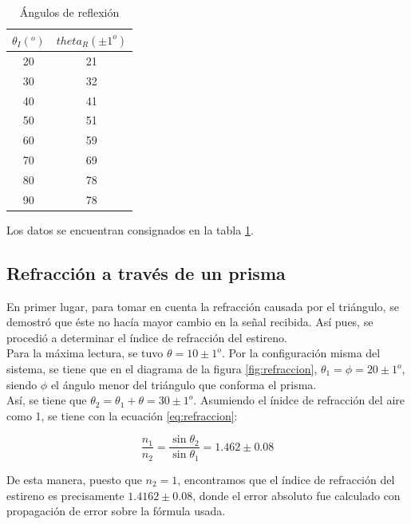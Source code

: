 \documentclass[%
 reprint,
 amsmath,amssymb,
 aps,
]{revtex4-1}
\begin{document}
\begin{table}[h!]
\centering
\begin{tabular}{|c|c|}
	\hline $ \theta_I (^o) $ & $ theta_R ( \pm 1^o  )$  \\ 
	\hline\hline
	20 &  21\\ 
	30 &  32\\ 
	40 &  41\\ 
	50 &  51\\ 
	60 &  59\\ 
	70 &  69\\ 
	80 &  78\\ 
	90 &  78\\ 
	[1ex] 
 \hline
 \end{tabular} 
  \caption{Ángulos de reflexión}
\label{table:incref} 
\end{table}

Los datos se encuentran consignados en la tabla \ref{table:incref}. \\

\subsection{\label{sec:level2}Refracción a través de un prisma} 

En primer lugar, para tomar en cuenta la refracción causada por el triángulo, se demostró que éste no hacía mayor cambio en la señal recibida. Así pues, se procedió a determinar el índice de refracción del estireno. \\

Para la máxima lectura, se tuvo $ \theta = 10 \pm 1^o $. Por la configuración misma del sistema, se tiene que en el diagrama de la figura \ref{fig:refraccion}, $ \theta_1 = \phi = 20\pm1^o $, siendo $ \phi $ el ángulo menor del triángulo que conforma el prisma. \\

Así, se tiene que $ \theta_2 = \theta_1 + \theta = 30\pm1^o $. Asumiendo el ínidce de refracción del aire como 1, se tiene con la ecuación \ref{eq:refraccion}:

\begin{equation}
\frac{n_1}{n_2} = \frac{\sin{\theta_2}}{\sin{\theta_1}}= 1.462\pm0.08
\end{equation}

De esta manera, puesto que $ n_2 = 1 $, encontramos que el índice de refracción del estireno es precisamente $1.4162\pm0.08$, donde el error absoluto fue calculado con propagación de error sobre la fórmula usada. \\
\end{document}
